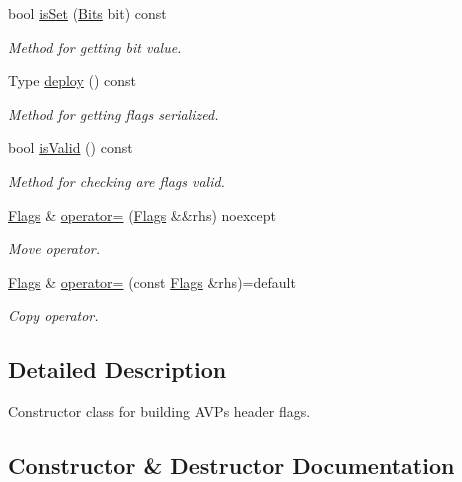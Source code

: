 \begin{DoxyCompactItemize}
bool \hyperlink{classDiameter_1_1AVP_1_1Header_1_1Flags_a8828e3f2e9d6242d8577178f6a910efd}{is\+Set} (\hyperlink{classDiameter_1_1AVP_1_1Header_1_1Flags_af24fa00d6135e01a5b58c9ae84245262}{Bits} bit) const
\begin{DoxyCompactList}\small\item\em Method for getting bit value. \end{DoxyCompactList}\item 
Type \hyperlink{classDiameter_1_1AVP_1_1Header_1_1Flags_aad359a4a25b2998c813c0923e67efeb8}{deploy} () const
\begin{DoxyCompactList}\small\item\em Method for getting flags serialized. \end{DoxyCompactList}\item 
bool \hyperlink{classDiameter_1_1AVP_1_1Header_1_1Flags_a6ab05074bd270c9593f524151443c879}{is\+Valid} () const
\begin{DoxyCompactList}\small\item\em Method for checking are flags valid. \end{DoxyCompactList}\item 
\hyperlink{classDiameter_1_1AVP_1_1Header_1_1Flags}{Flags} \& \hyperlink{classDiameter_1_1AVP_1_1Header_1_1Flags_aef292134b9d9f7c46a382ffdf95327ba}{operator=} (\hyperlink{classDiameter_1_1AVP_1_1Header_1_1Flags}{Flags} \&\&rhs) noexcept
\begin{DoxyCompactList}\small\item\em Move operator. \end{DoxyCompactList}\item 
\hyperlink{classDiameter_1_1AVP_1_1Header_1_1Flags}{Flags} \& \hyperlink{classDiameter_1_1AVP_1_1Header_1_1Flags_a8a630e537a7e2135c032a2f94fcb59ea}{operator=} (const \hyperlink{classDiameter_1_1AVP_1_1Header_1_1Flags}{Flags} \&rhs)=default
\begin{DoxyCompactList}\small\item\em Copy operator. \end{DoxyCompactList}\end{DoxyCompactItemize}


\subsection{Detailed Description}
Constructor class for building A\+V\+Ps header flags. 

\subsection{Constructor \& Destructor Documentation}
\mbox{\label{classDiameter_1_1AVP_1_1Header_1_1Flags_aafe29286cfb1709d9bc5b23106e62d70}} 
